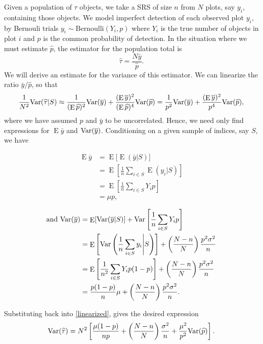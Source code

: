 \documentclass[usenames,dvipsnames]{homework}
\DeclareMathOperator{\E}{E}
\begin{document}
\begin{solution}
  Given a population of $\tau$ objects, we take a SRS of size $n$ from $N$ plots, say $y_i$, containing those objects.  We model imperfect detection of each observed plot $y_i$, by Bernouli trials $y_i \sim \text{Bernoulli}(Y_i,p)$ where $Y_i$ is the true number of objects in plot $i$ and $p$ is the common probability of detection.  In the situation where we must estimate $\hat p$, the estimator for the population total is
  \begin{equation*}
    \hat\tau = \frac{N\bar y}{\hat p}.
  \end{equation*}
  We will derive an estimate for the variance of this estimator. We can linearize the ratio $\bar y / \hat p$, so that 
  \begin{equation}
    \frac 1{N^2} \Var(\hat \tau|S) 
    \approx \frac 1{(\E \hat p)^2} \Var(\bar y) + \frac{(\E \bar y)^2}{(\E \hat p)^4}\Var(\hat p) = \frac{1}{p^2} \Var(\bar y) + \frac{(\E \bar y)^2}{p^4}\Var(\hat p),
    \label{linearized}
  \end{equation}
  where we have assumed $\hat p$ and $\bar y$ to be uncorrelated. Hence, we need only find expressions for $\E \bar y$ and $\mathrm{Var}(\overline y)$.  Conditioning on a given sample of indices, say $S$, we have

  \begin{minipage}{.25\textwidth}
  \begin{align*}
    \E\bar y 
    &= \E\Big[ \E( \bar y | S ) \Big] \\
    &= \E\left[ \frac 1n \sum_{i\in S} \E (y_i | S)  \right] \\
    &= \E\left[ \frac 1n \sum_{i\in S} Y_ip \right] \\
    &= \mu p,
  \end{align*}
  \end{minipage}
  \begin{minipage}{.7\textwidth}
  \begin{align*}
    \text{and } \Var (\bar y)
    &=  \E[\Var(\bar y | S)] + \Var\left[\frac 1n \sum_{i\in S} Y_ip\right] \\
    &=  \E\left[\Var\left(\frac 1n\sum_{i\in S} y_i \middle| S\right)\right] + \left(\frac {N-n}{N} \right)\frac{p^2\sigma^2}n \\
    &=  \E\left[\frac 1{n^2}\sum_{i\in S} Y_ip(1-p) \right] + \left(\frac {N-n}{N} \right)\frac{p^2\sigma^2}n \\
    &=  \frac {p(1-p)}{n}\mu + \left(\frac {N-n}{N} \right)\frac{p^2\sigma^2}n. 
  \end{align*}
  \end{minipage}
  Substituting back into \eqref{linearized}, gives the desired expression
  \begin{equation*}
    \mathrm{Var}(\widehat\tau) =  N^2 \left[ \frac {\mu(1-p)}{np} + \left(\frac {N-n}{N} \right)\frac{\sigma^2}n + \frac{\mu^2}{p^2}\mathrm{Var}(\widehat p) \right].
  \end{equation*}
\end{solution}
\end{document}
